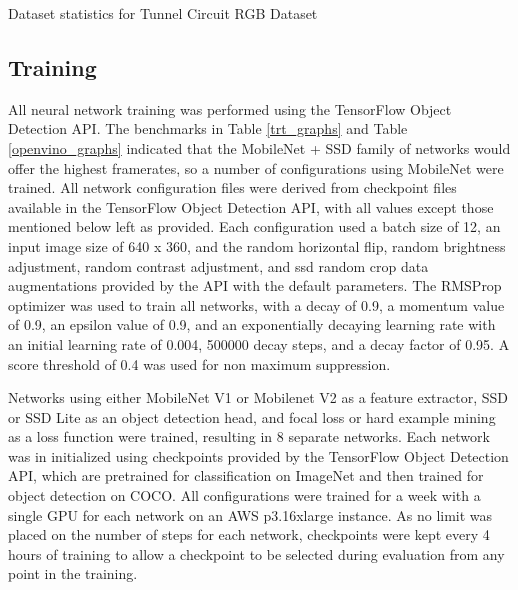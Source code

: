 
\begin{table}
	\centering
	\begin{adjustbox}{max width=.9\textwidth}
	\end{adjustbox}
	\caption{Dataset statistics for Tunnel Circuit RGB Dataset}
	\label{rgb_statistics}
\end{table}
 
\subsection{Training}

All neural network training was performed using the TensorFlow Object Detection API. The benchmarks in Table \ref{trt_graphs} and Table \ref{openvino_graphs} indicated that the MobileNet + SSD family of networks would offer the highest framerates, so a number of configurations using MobileNet were trained. All network configuration files were derived from checkpoint files available in the TensorFlow Object Detection API, with all values except those mentioned below left as provided. Each configuration used a batch size of 12, an input image size of 640 x 360, and the random horizontal flip, random brightness adjustment, random contrast adjustment, and ssd random crop data augmentations provided by the API with the default parameters. The RMSProp optimizer was used to train all networks, with a decay of 0.9, a momentum value of 0.9, an epsilon value of 0.9, and an exponentially decaying learning rate with an initial learning rate of 0.004, 500000 decay steps, and a decay factor of 0.95. A score threshold of 0.4 was used for non maximum suppression.

Networks using either MobileNet V1 or Mobilenet V2 as a feature extractor, SSD or SSD Lite as an object detection head, and focal loss or hard example mining as a loss function were trained, resulting in 8 separate networks. Each network was in initialized using checkpoints provided by the TensorFlow Object Detection API, which are pretrained for classification on ImageNet and then trained for object detection on COCO. All configurations were trained for a week with a single GPU for each network on an AWS p3.16xlarge instance. As no limit was placed on the number of steps for each network, checkpoints were kept every 4 hours of training to allow a checkpoint to be selected during evaluation from any point in the training.


